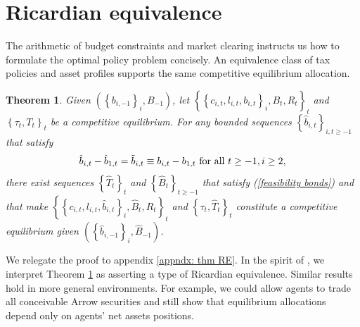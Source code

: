 \documentclass[thmsb,11pt]{article}
\newtheorem{theorem}{Theorem}
\begin{document}
\color{black}

\section{Ricardian equivalence \label{sec:Ricardian101}}
The arithmetic of budget constraints and market clearing instructs us how to  formulate the optimal policy problem concisely.
An equivalence class of tax policies and asset profiles supports the same competitive equilibrium allocation.

\begin{theorem}
\label{theorem: main} Given $\left( \left \{ b_{i,-1}\right \}
_{i},B_{-1}\right) $, let $\left \{ \left \{ c_{i,t},l_{i,t},b_{i,t}\right \} _{i},B_{t},R_{t}\right \} _{t} $ and $\left \{ \tau _{t},T_{t}\right
\} _{t}$ be a competitive equilibrium. For any bounded sequences $%
\left \{ \hat{b}_{i,t}\right \} _{i,t\geq -1}$ that satisfy
\begin{equation*}
\hat{b}_{i,t}-\hat{b}_{1,t}=\tilde{b}_{i,t}\equiv b_{i,t}	-b_{1,t} \ \text{\rm  for all }t\geq -1,i\geq 2,
\end{equation*}%
there exist  sequences $\left \{ \hat{T}_{t}\right \} _{t}$ and $%
\left \{ \hat{B}_{t}\right \} _{t\geq -1}$ that satisfy (\ref{feasibility
bonds}) and that make $\left \{ \left \{ c_{i,t},l_{i,t},\hat{b}%
_{i,t}\right \} _{i},\hat{B}_{t},R_{t}\right \} _{t}$ and $\left \{
\tau _{t},\hat{T}_{t}\right \} _{t}$ constitute a competitive
equilibrium given $\left( \left \{ \hat{b}_{i,-1}\right \} _{i},\hat{B}%
_{-1}\right) $.
\end{theorem}

We relegate the proof to appendix \ref{appndx: thm RE}. In the spirit of \citet{Barro1974}, we interpret Theorem \ref{theorem: main} as  asserting a type of  Ricardian equivalence.
Similar results  hold in more general environments. For example, we could allow
agents to trade all conceivable  Arrow securities and still show that  equilibrium allocations depend only on agents' net assets positions.
\end{document}

